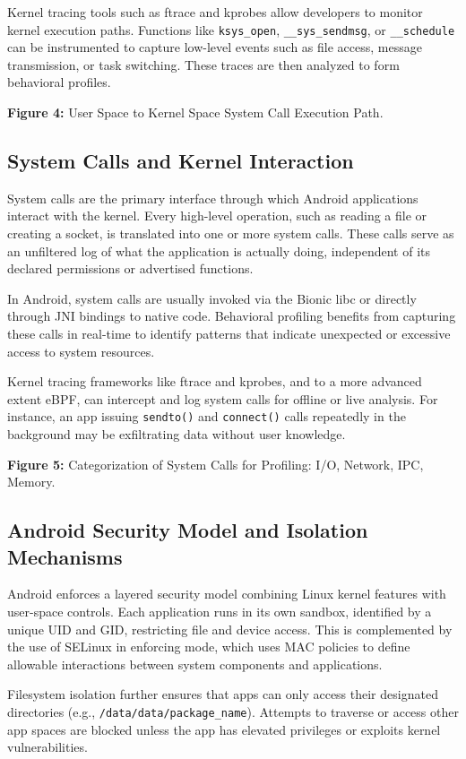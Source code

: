 \documentclass[a4paper,12pt]{report}
\begin{document}
Kernel tracing tools such as ftrace and kprobes allow developers to monitor kernel execution paths. Functions like \texttt{ksys\_open}, \texttt{\_\_sys\_sendmsg}, or \texttt{\_\_schedule} can be instrumented to capture low-level events such as file access, message transmission, or task switching. These traces are then analyzed to form behavioral profiles.

\textbf{Figure 4:} User Space to Kernel Space System Call Execution Path.

\subsection{System Calls and Kernel Interaction}
System calls are the primary interface through which Android applications interact with the kernel. Every high-level operation, such as reading a file or creating a socket, is translated into one or more system calls. These calls serve as an unfiltered log of what the application is actually doing, independent of its declared permissions or advertised functions.

In Android, system calls are usually invoked via the Bionic libc or directly through JNI bindings to native code. Behavioral profiling benefits from capturing these calls in real-time to identify patterns that indicate unexpected or excessive access to system resources.

Kernel tracing frameworks like ftrace and kprobes, and to a more advanced extent eBPF, can intercept and log system calls for offline or live analysis. For instance, an app issuing \texttt{sendto()} and \texttt{connect()} calls repeatedly in the background may be exfiltrating data without user knowledge.

\textbf{Figure 5:} Categorization of System Calls for Profiling: I/O, Network, IPC, Memory.

\subsection{ Android Security Model and Isolation Mechanisms}
Android enforces a layered security model combining Linux kernel features with user-space controls. Each application runs in its own sandbox, identified by a unique UID and GID, restricting file and device access. This is complemented by the use of SELinux in enforcing mode, which uses MAC policies to define allowable interactions between system components and applications.

Filesystem isolation further ensures that apps can only access their designated directories (e.g., \texttt{/data/data/{package\_name}}). Attempts to traverse or access other app spaces are blocked unless the app has elevated privileges or exploits kernel vulnerabilities.
\end{document}
